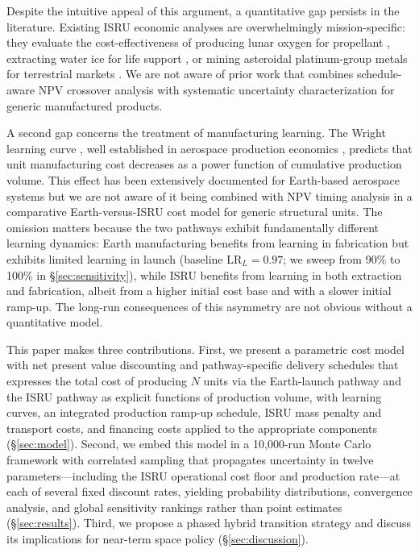 \documentclass[preprint,12pt]{elsarticle}
\begin{document}
Despite the intuitive appeal of this argument, a quantitative gap persists in the literature. Existing ISRU economic analyses are overwhelmingly mission-specific: they evaluate the cost-effectiveness of producing lunar oxygen for propellant \cite{sanders2015}, extracting water ice for life support \cite{zubrin1996}, or mining asteroidal platinum-group metals for terrestrial markets \cite{sonter1997,elvis2012}. We are not aware of prior work that combines schedule-aware NPV crossover analysis with systematic uncertainty characterization for generic manufactured products.

A second gap concerns the treatment of manufacturing learning. The Wright learning curve \cite{wright1936}, well established in aerospace production economics \cite{wertz2011}, predicts that unit manufacturing cost decreases as a power function of cumulative production volume. This effect has been extensively documented for Earth-based aerospace systems \cite{argote1990,nagy2013} but we are not aware of it being combined with NPV timing analysis in a comparative Earth-versus-ISRU cost model for generic structural units. The omission matters because the two pathways exhibit fundamentally different learning dynamics: Earth manufacturing benefits from learning in fabrication but exhibits limited learning in launch (baseline $\mathrm{LR}_L = 0.97$; we sweep from 90\% to 100\% in \S\ref{sec:sensitivity}), while ISRU benefits from learning in both extraction and fabrication, albeit from a higher initial cost base and with a slower initial ramp-up. The long-run consequences of this asymmetry are not obvious without a quantitative model.

This paper makes three contributions. First, we present a parametric cost model with net present value discounting and pathway-specific delivery schedules that expresses the total cost of producing $N$ units via the Earth-launch pathway and the ISRU pathway as explicit functions of production volume, with learning curves, an integrated production ramp-up schedule, ISRU mass penalty and transport costs, and financing costs applied to the appropriate components (\S\ref{sec:model}). Second, we embed this model in a 10{,}000-run Monte Carlo framework with correlated sampling that propagates uncertainty in twelve parameters---including the ISRU operational cost floor and production rate---at each of several fixed discount rates, yielding probability distributions, convergence analysis, and global sensitivity rankings rather than point estimates (\S\ref{sec:results}). Third, we propose a phased hybrid transition strategy and discuss its implications for near-term space policy (\S\ref{sec:discussion}).
\end{document}
